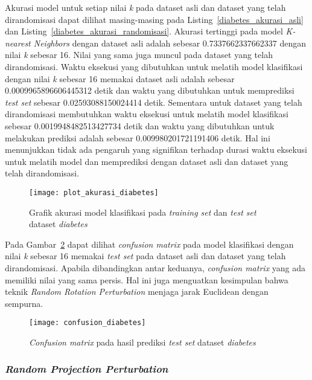 Akurasi model untuk setiap nilai \textit{k} pada dataset asli dan dataset yang telah dirandomisasi dapat dilihat masing-masing pada Listing~\ref{diabetes_akurasi_asli} dan Listing~\ref{diabetes_akurasi_randomisasi}. Akurasi tertinggi pada model \textit{K-nearest Neighbors} dengan dataset asli adalah sebesar 0.7337662337662337 dengan nilai \textit{k} sebesar 16. Nilai yang sama juga muncul pada dataset yang telah dirandomisasi. Waktu eksekusi yang dibutuhkan untuk melatih model klasifikasi dengan nilai \textit{k} sebesar 16 memakai dataset asli adalah sebesar 0.0009965896606445312 detik dan waktu yang dibutuhkan untuk memprediksi \textit{test set} sebesar 0.02593088150024414 detik. Sementara untuk dataset yang telah dirandomisasi membutuhkan waktu eksekusi untuk melatih model klasifikasi sebesar 0.0019948482513427734 detik dan waktu yang dibutuhkan untuk melakukan prediksi adalah sebesar 0.009980201721191406 detik. Hal ini menunjukkan tidak ada pengaruh yang signifikan terhadap durasi waktu eksekusi untuk melatih model dan memprediksi dengan dataset asli dan dataset yang telah dirandomisasi.

\begin{figure}
	\centering
	\texttt{[image: plot\_akurasi\_diabetes]}
	\caption{Grafik akurasi model klasifikasi pada \textit{training set} dan \textit{test set} dataset \textit{diabetes}}
	\label{fig:plot_akurasi_diabetes}
\end{figure}

Pada Gambar~\ref{fig:confusion_diabetes} dapat dilihat \textit{confusion matrix} pada model klasifikasi dengan nilai \textit{k} sebesar 16 memakai \textit{test set} pada dataset asli dan dataset yang telah dirandomisasi. Apabila dibandingkan antar keduanya, \textit{confusion matrix} yang ada memiliki nilai yang sama persis. Hal ini juga menguatkan kesimpulan bahwa teknik \textit{Random Rotation Perturbation} menjaga jarak Euclidean dengan sempurna.

\begin{figure}
	\centering
	\texttt{[image: confusion\_diabetes]}
	\caption{\textit{Confusion matrix} pada hasil prediksi \textit{test set} dataset \textit{diabetes}}
	\label{fig:confusion_diabetes}
\end{figure}

\subsubsection{\textit{Random Projection Perturbation}}
\label{sec:pengujian-klasifikasi-rpp}

